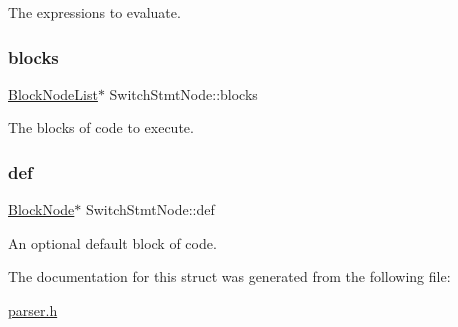 The expressions to evaluate. \mbox{\label{struct_switch_stmt_node_a6cdb5c66044261b28302b6ca682d7564}} 
\subsubsection{\texorpdfstring{blocks}{blocks}}
{\footnotesize\ttfamily \hyperlink{struct_block_node_list}{Block\+Node\+List}$\ast$ Switch\+Stmt\+Node\+::blocks}

The blocks of code to execute. \mbox{\label{struct_switch_stmt_node_ad75de1632a46c451d251959e56d53d44}} 
\subsubsection{\texorpdfstring{def}{def}}
{\footnotesize\ttfamily \hyperlink{struct_block_node}{Block\+Node}$\ast$ Switch\+Stmt\+Node\+::def}

An optional default block of code. 

The documentation for this struct was generated from the following file\+:\begin{DoxyCompactItemize}
\item 
\hyperlink{parser_8h}{parser.\+h}\end{DoxyCompactItemize}
